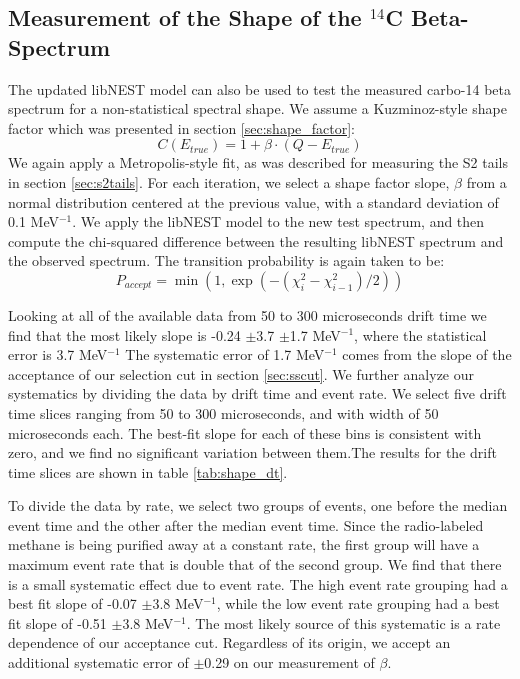 \subsection{Measurement of the Shape of the $^{14}$C Beta-Spectrum}
The updated libNEST model can also be used to test the measured carbo-14 beta spectrum for a non-statistical spectral shape. We assume a Kuzminoz-style shape factor\cite{C14_kuzminov} which was presented in section \ref{sec:shape_factor}:
\begin{equation}
C(E_{true})=1+\beta\cdot(Q-E_{true})
\end{equation}
We again apply a Metropolis-style fit, as was described for measuring the S2 tails in section \ref{sec:s2tails}. For each iteration, we select a shape factor slope, $\beta$ from a normal distribution centered at the previous value, with a standard deviation of 0.1 MeV$^{-1}$. We apply the libNEST model to the new test spectrum, and then compute the chi-squared difference between the resulting libNEST spectrum and the observed spectrum. The transition probability is again taken to be:
\begin{equation}
P_{accept}=\min(1,\exp(-(\chi_i^2-\chi_{i-1}^2)/2))
\end{equation}

Looking at all of the available data from 50 to 300 microseconds drift time we find that the most likely slope is -0.24 $\pm$3.7 $\pm$1.7 MeV$^{-1}$, where the statistical error is 3.7 MeV$^{-1}$ The systematic error of 1.7 MeV$^{-1}$ comes from the slope of the acceptance of our selection cut in section \ref{sec:sscut}. We further analyze our systematics by dividing the data by drift time and event rate. We select five drift time slices ranging from 50 to 300 microseconds, and with width of 50 microseconds each. The best-fit slope for each of these bins is consistent with zero, and we find no significant variation between them.The results for the drift time slices are shown in table \ref{tab:shape_dt}. 

To divide the data by rate, we select two groups of events, one before the median event time and the other after the median event time. Since the radio-labeled methane is being purified away at a constant rate, the first group will have a maximum event rate that is double that of the second group. We find that there is a small systematic effect due to event rate. The high event rate grouping had a best fit slope of -0.07 $\pm$3.8 MeV$^{-1}$, while the low event rate grouping had a best fit slope of -0.51 $\pm$3.8 MeV$^{-1}$. The most likely source of this systematic is a rate dependence of our acceptance cut. Regardless of its origin, we accept an additional systematic error of $\pm$0.29 on our measurement of $\beta$. 

